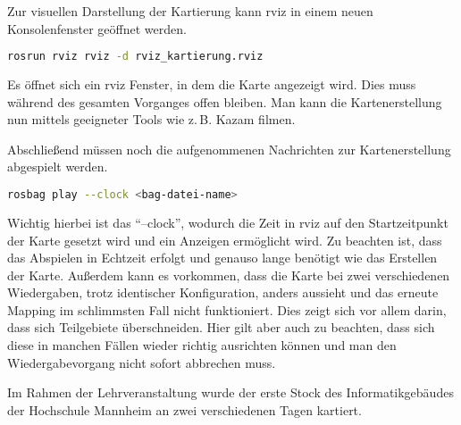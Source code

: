 Zur visuellen Darstellung der Kartierung kann rviz in einem neuen Konsolenfenster geöffnet werden.

\begin{lstlisting}[language=sh,caption=Rechte]
    rosrun rviz rviz -d rviz_kartierung.rviz
\end{lstlisting}

Es öffnet sich ein rviz Fenster, in dem die Karte angezeigt wird. Dies muss während des gesamten Vorganges offen bleiben. Man kann die Kartenerstellung nun mittels geeigneter Tools wie z.\,B. Kazam filmen.

Abschließend müssen noch die aufgenommenen Nachrichten zur Kartenerstellung abgespielt werden.

\begin{lstlisting}[language=sh,caption=Rechte]
    rosbag play --clock <bag-datei-name>
\end{lstlisting}

Wichtig hierbei ist das \enquote{--clock}, wodurch die Zeit in rviz auf den Startzeitpunkt der Karte gesetzt wird und ein Anzeigen ermöglicht wird. Zu beachten ist, dass das Abspielen in Echtzeit erfolgt und genauso lange benötigt wie das Erstellen der Karte. Außerdem kann es vorkommen, dass die Karte bei zwei verschiedenen Wiedergaben, trotz identischer Konfiguration, anders aussieht und das erneute Mapping im schlimmsten Fall nicht funktioniert. Dies zeigt sich vor allem darin, dass sich Teilgebiete überschneiden. Hier gilt aber auch zu beachten, dass sich diese in manchen Fällen wieder richtig ausrichten können und man den Wiedergabevorgang nicht sofort abbrechen muss.\par
Im Rahmen der Lehrveranstaltung wurde der erste Stock des Informatikgebäudes der Hochschule Mannheim an zwei verschiedenen Tagen kartiert.

